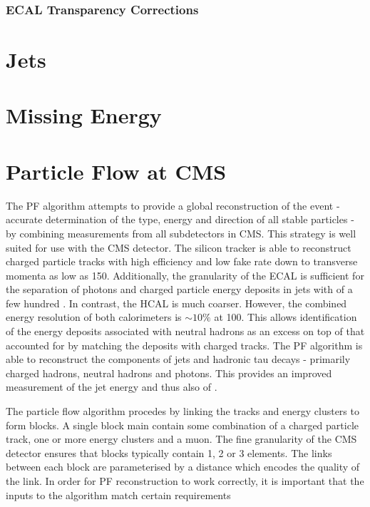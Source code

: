 \subsubsection{\ac{ECAL} Transparency Corrections}
\label{sec:reco_ecal_transparency}
\section{Jets}
\section{Missing Energy}

\section{Particle Flow at \ac{CMS}}
The \ac{PF} algorithm \cite{cms_pf_pas} attempts to provide a global
reconstruction of the event - accurate determination of the type, energy and
direction of all stable particles - by combining measurements from all
subdetectors in \ac{CMS}. This strategy is well suited for use with the \ac{CMS}
detector. The silicon tracker is able to reconstruct charged particle tracks
with high efficiency and low fake rate down to transverse momenta as low as
\unit{150}{\MeV}. Additionally, the granularity of the \ac{ECAL} is sufficient
for the separation of photons and charged particle energy deposits in jets with
\Pt of a few hundred \GeV. In contrast, the \ac{HCAL} is much coarser. However,
the combined energy resolution of both calorimeters is $\sim 10\%$ at
\unit{100}{\GeV}. This allows identification of the energy deposits associated
with neutral hadrons as an excess on top of that accounted for by matching the
deposits with charged tracks. The \ac{PF} algorithm is able to reconstruct the
components of jets and hadronic tau decays - primarily charged hadrons, neutral
hadrons and photons. This provides an improved measurement of the jet energy and
thus also of \MET.

The particle flow algorithm procedes by linking the tracks and energy clusters
to form blocks. A single block main contain some combination of a charged
particle track, one or more energy clusters and a muon. The fine granularity of
the \ac{CMS} detector ensures that blocks typically contain 1, 2 or 3 elements.
The links between each block are parameterised by a distance which encodes the
quality of the link. In order for \ac{PF} reconstruction to work correctly, it
is important that the inputs to the algorithm match certain requirements

